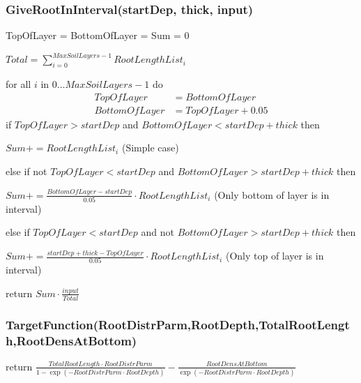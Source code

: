 \documentclass[%
]{scrartcl}
\begin{document}
\subsubsection*{GiveRootInInterval(startDep, thick, input)}

  
 TopOfLayer =
  BottomOfLayer  =
  Sum  =
	0
	

 $Total = \sum_{i=0}^{MaxSoilLayers - 1} RootLengthList_i$


	for all $i$ in $0 \dots MaxSoilLayers - 1$ do   	
   	\begin{align*}
      	TopOfLayer    & = BottomOfLayer \\
      	BottomOfLayer & = TopOfLayer+0.05
   	\end{align*}   
  if $TopOfLayer > startDep$   
  and $BottomOfLayer < startDep+thick$ then
   
          
  \quad	$Sum += RootLengthList_i$  (Simple case) 
      	
    	else if not $TopOfLayer < startDep$ and $	BottomOfLayer> startDep+thick $ then
      	 	
   \quad                    
            $Sum +=  \tfrac{BottomOfLayer-startDep}{0.05}  \cdot  RootLengthList_i$
(Only bottom of layer is in interval)            

    
      	else if $TopOfLayer <  startDep$  and not $BottomOfLayer> startDep+thick$ then
            	
     \quad                          
               $Sum +=  \tfrac{startDep+thick-TopOfLayer}{0.05}  \cdot  RootLengthList_i$
  (Only top of layer is in interval)
               
return $Sum  \cdot   \tfrac{input}{Total}$

\subsubsection*{TargetFunction(RootDistrParm,RootDepth,TotalRootLength,RootDensAtBottom)}
	return $\tfrac{TotalRootLength  \cdot  RootDistrParm}{1-\exp(-RootDistrParm  \cdot  RootDepth)}
		-\tfrac{RootDensAtBottom}{\exp(-RootDistrParm  \cdot  RootDepth)} $
\end{document}
